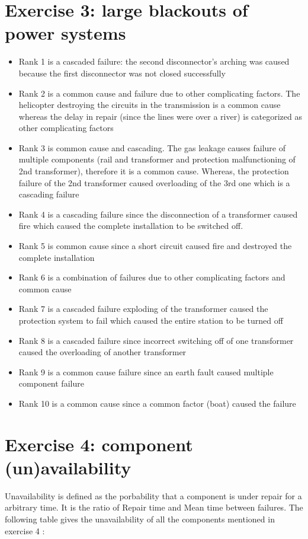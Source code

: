 \section*{\textbf{Exercise 3: large blackouts of power systems}}
\begin{itemize}
    \item Rank 1 is a cascaded failure: the second disconnector's arching was caused because the first disconnector was not closed successfully
    \item Rank 2 is a common cause and failure due to other complicating factors. The helicopter destroying the circuits in the transmission is a common cause whereas the delay in repair (since the lines were over a river) is categorized as other complicating factors
    \item Rank 3 is common cause and cascading. The gas leakage causes failure of multiple components (rail and transformer and protection malfunctioning of 2nd transformer), therefore it is a common cause. Whereas, the protection failure of the 2nd transformer caused overloading of the 3rd one which is a cascading failure
    \item Rank 4 is a cascading failure since the disconnection of a transformer caused fire which caused the complete installation to be switched off.
    \item Rank 5 is common cause since a short circuit caused fire and destroyed the complete installation
    \item Rank 6 is a combination of failures due to other complicating factors and common cause
    \item Rank 7 is a cascaded failure exploding of the transformer caused the protection system to fail which caused the entire station to be turned off
    \item Rank 8 is a cascaded failure since incorrect switching off of one transformer caused the overloading of another transformer
    \item Rank 9 is a common cause failure since an earth fault caused multiple component failure
    \item Rank 10 is a common cause since a common factor (boat) caused the failure
\end{itemize}
\section*{\textbf{Exercise 4: component (un)availability}}
Unavailability is defined as the porbability that a component is under repair for a arbitrary time. It is the ratio of Repair time and Mean time between failures.
 The following table gives the unavailability of all the components mentioned in exercise 4 :

